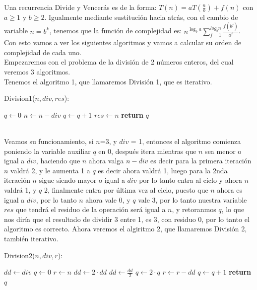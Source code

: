 \documentclass[12pt,twoside]{article}
\begin{document}
\\ Una recurrencia Divide y Vencerás es de la forma: $T(n)=aT(\frac{n}{b})+f(n)$ con $a\geq 1$ y $b\geq 2$. Igualmente mediante sustitución hacia atrás, con el cambio de variable $n=b^k$, tenemos que la función de complejidad es: $n^{\log_ba}\sum_{j=1}^{log_bn} \frac{f(b^j)}{a^j}$.
\newpage
Con esto vamos a ver los siguientes algoritmos y vamos a calcular su orden de complejidad de cada uno.
\\ Empezaremos con el problema de la división de 2 números enteros, del cual veremos 3 algoritmos.
\newline
\\ Tenemos el algoritmo 1, que llamaremos División 1, que es iterativo.
\begin{algorithm}
    \caption{Division1($n,div,res$):}
    \begin{algorithmic}
        \State $q \gets 0$
            \State $n \gets n-div$
            \State $q \gets q+1$
        \EndWhile
        \State $res \gets n$
        \State \textbf{return} $q$
    \end{algorithmic}
\end{algorithm}
\\ Veamos su funcionamiento, si $n$=3, y $div$ = 1, entonces el algoritmo comienza poniendo la variable auxiliar $q$ en 0, después itera mientras que $n$ sea menor o igual a $div$, haciendo que $n$ ahora valga $n-div$ es decir para la primera iteración $n$ valdrá 2, y le aumenta 1 a $q$ es decir ahora valdrá 1, luego para la 2nda iteración $n$ sigue siendo mayor o igual a $div$ por lo tanto entra al ciclo y ahora $n$ valdrá 1, y $q$ 2, finalmente entra por última vez al ciclo, puesto que $n$ ahora es igual a $div$, por lo tanto $n$ ahora vale 0, y $q$ vale 3, por lo tanto nuestra variable $res$ que tendrá el residuo de la operación será igual a $n$, y retoranmos $q$, lo que nos diría que el resultado de dividir 3 entre 1, es 3, con residuo 0, por lo tanto el algoritmo es correcto.
\newpage
Ahora veremos el algiritmo 2, que llamaremos División 2, también iterativo.
\begin{algorithm}
    \caption{Division2($n,div,r$):}
    \begin{algorithmic}
        \State $dd \gets div$
        \State $q \gets 0$
        \State $r \gets n$
            \State $dd \gets 2\cdot dd$
        \EndWhile
            \State $dd \gets \frac{dd}{2}$
            \State $q \gets 2\cdot q$
                \State $r \gets r-dd$
                \State $q \gets q+1$
            \EndIf
        \EndWhile
        \State \textbf{return} $q$
    \end{algorithmic}
\end{algorithm}
\end{document}
